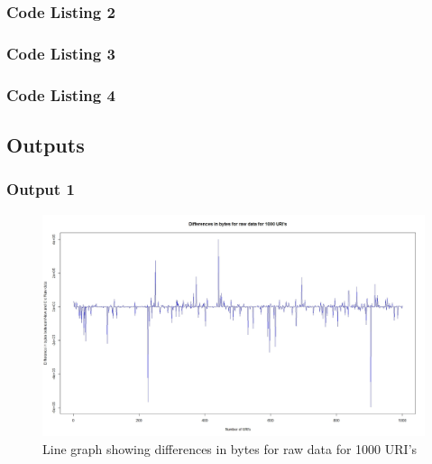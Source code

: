 \subsubsection{Code Listing 2}


\newpage

\subsubsection{Code Listing 3}


\newpage

\subsubsection{Code Listing 4}



\subsection{Outputs}
\subsubsection{Output 1}
\begin{figure}[ht]    
    \begin{center}
        \includegraphics[scale=0.3]{raw_graph.jpeg}
        \caption{Line graph showing differences in bytes for raw data for 1000 URI's}
        \label{Samplet41}
    \end{center}
\end{figure}
\newpage

